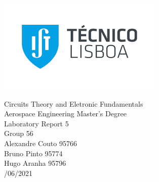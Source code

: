 
\thispagestyle {empty}

\includegraphics[bb=-2.5cm 5cm 0cm 0cm,scale=1.00]{../figlib/index.png}

\begin{center}
%
\vspace{3.0cm}

\vspace{1cm}
{\FontLb Circuits Theory and Eletronic Fundamentals} \\ %
\vspace{1cm}
{\FontSn Aerospace Engineering Master's Degree} \\ %
\vspace{1cm}
{\FontSn Laboratory  Report 5} \\ 
\vspace{1cm}
{\FontSn Group 56 } \\
\vspace{1cm}
{\FontSn Alexandre Couto 95766} \\
\vspace{0.1cm}
{\FontSn Bruno Pinto     95774} \\
\vspace{0.1cm}
{\FontSn Hugo Aranha     95796} \\
\vspace{0.5cm}
{/06/2021} \\ %
%
\end{center}
\newpage
